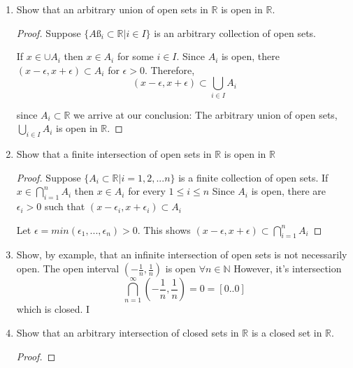 \documentclass{tufte-book}
\theoremstyle{mytheoremstyle}
\theoremstyle{mylemstyle}
\theoremstyle{mydefstyle}
\begin{document}
\begin{enumerate}
\begin{proof}
\[I_0 = I, I_1, I_2, ..., I_n = J  \in \mathcal{O}\]

Such that $I_k \cap I_{k+1} \neq \emptyset$ for $k=0, ..., n-1$.  Then $\sim$ defines an equivalence relation on $\mathcal{O}$.  For $I \in \mathcal{O}$ let $[I]$ be the $\sim$ of $I$.  Then $\{\cup[I] \text{ for } I \in \mathcal{O}\}$ is decomposition of $U$ into pairwise disjoint intervals.  By construction, these intervals are countable.

\end{proof}

\item Show that an arbitrary union of open sets in $\mathbb{R}$ is open in $\mathbb{R}$.

\begin{proof}
Suppose $\{Aß_i \subset \mathbb{R} | i \in I\}$ is an arbitrary collection of open sets.

If $x \in \cup A_i$ then $x \in A_i$ for some $i \in I$.  Since $A_i$ is open,  there $(x - \epsilon, x+ \epsilon) \subset A_i$ for $\epsilon > 0$.  Therefore,
\[ (x-\epsilon, x+\epsilon) \subset \bigcup\limits_{i \in I}A_i \]

 since $A_i \subset \mathbb{R}$ we arrive at our conclusion: The arbitrary union of open sets, $\bigcup\limits_{i \in I}A_i$ is open in $\mathbb{R}$. 
\end{proof}

\item Show that a finite intersection of open sets in $\mathbb{R}$ is open in $\mathbb{R}$
\begin{proof}
Suppose $\{A_i \subset \mathbb{R} | i = 1,2,...n\}$ is a finite collection of open sets.  If $ x \in \bigcap\limits_{i=1}^{n} A_i $ then $x \in A_i$ for every $1 \leq i \leq n$ Since $A_i$ is open, there are $\epsilon_i > 0$  such that $(x - \epsilon_i , x+ \epsilon_i) \subset A_i$

Let $\epsilon = min(\epsilon_1,..., \epsilon_n) > 0$.  This shows $(x - \epsilon, x+ \epsilon) \subset  \bigcap\limits_{i=1}^{n} A_i $

\end{proof}

\item Show, by example, that an infinite intersection of open sets is not necessarily open.
The open interval $(- \frac{1}{n},\frac{1}{n})$ is open $\forall n \in \mathbb{N}$  However, it's intersection
\[ \bigcap\limits_{n=1}^{\infty}(- \frac{1}{n},\frac{1}{n}) = {0} = [0..0] \]
which is closed.  I

\item Show that an arbitrary intersection of closed sets in $\mathbb{R}$ is a closed set in $\mathbb{R}$.
\begin{proof}


\end{proof}
\end{enumerate}
\end{document}
